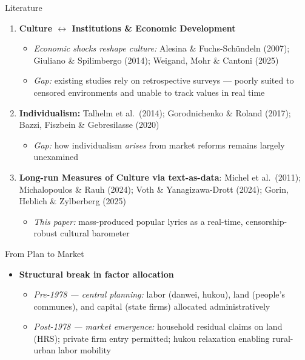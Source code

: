 \documentclass[aspectratio=169]{beamer}
\begin{document}
\begin{frame}{Literature}
\small
\begin{enumerate}
  \item \textbf{Culture $\leftrightarrow$ Institutions \& Economic Development}
  \begin{itemize}
    \item \textit{Economic shocks reshape culture:} Alesina \& Fuchs-Sch\"{u}ndeln (2007); Giuliano \& Spilimbergo (2014); Weigand, Mohr \& Cantoni (2025)
    \item \textit{Gap:} existing studies rely on retrospective surveys — \alert{poorly suited to censored environments} and unable to track values in real time
  \end{itemize}
  \vspace{0.3em}
  \item \textbf{Individualism:} Talhelm et al.\ (2014); Gorodnichenko \& Roland (2017); Bazzi, Fiszbein \& Gebresilasse (2020)
  \begin{itemize}
    \item \textit{Gap:} how individualism \textit{arises} from market reforms remains largely unexamined
  \end{itemize}
  \vspace{0.3em}
  \item \textbf{Long-run Measures of Culture via text-as-data}: Michel et al.\ (2011); Michalopoulos \& Rauh (2024); Voth \& Yanagizawa-Drott (2024); Gorin, Heblich \& Zylberberg (2025)
  \begin{itemize}
    \item \textit{This paper:} mass-produced popular lyrics as a \alert{real-time, censorship-robust} cultural barometer
  \end{itemize}
\end{enumerate}
\end{frame}

\begin{frame}{From Plan to Market}

\begin{itemize}\setlength\itemsep{0.7em}
  \item \textbf{Structural break in factor allocation}
  \medskip
  \begin{itemize}\setlength\itemsep{0.5em}
    \item \textit{Pre-1978 — central planning:} labor (danwei, hukou), land (people's communes), and capital (state firms) allocated administratively
    \item \textit{Post-1978 — market emergence:} household residual claims on land (HRS); private firm entry permitted; hukou relaxation enabling rural-urban labor mobility
  \end{itemize}
\end{itemize}

\end{frame}
\end{document}
